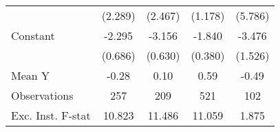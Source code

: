 {\begin{tabular}{l*{4}{c}}
                    &     (2.289)         &     (2.467)         &     (1.178)         &     (5.786)         \\
\addlinespace
Constant            &      -2.295\sym{***}&      -3.156\sym{***}&      -1.840\sym{***}&      -3.476\sym{**} \\
                    &     (0.686)         &     (0.630)         &     (0.380)         &     (1.526)         \\
\midrule
Mean Y              &       -0.28         &        0.10         &        0.59         &       -0.49         \\
Observations        &         257         &         209         &         521         &         102         \\
Exc. Inst. F-stat   &      10.823         &      11.486         &      11.059         &       1.875         \\
\bottomrule
\end{tabular}
}
